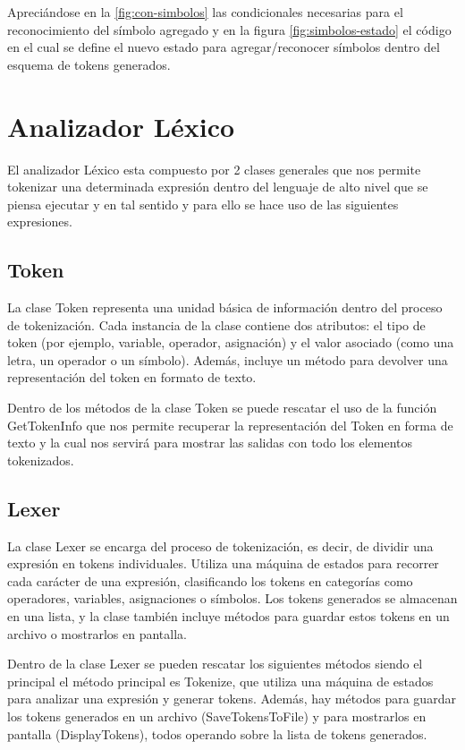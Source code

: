 \documentclass[conference]{IEEEtran}
\begin{document}
	Apreciándose en la \ref{fig:con-simbolos} las condicionales necesarias para el reconocimiento del símbolo agregado y en la figura \ref{fig:simbolos-estado} el código en el cual se define el nuevo estado para agregar/reconocer símbolos dentro del esquema de tokens generados.
	
	\section{Analizador Léxico}
	El analizador Léxico esta compuesto por 2 clases generales que nos permite tokenizar una determinada expresión dentro del lenguaje de alto nivel que se piensa ejecutar y en tal sentido y para ello se hace uso de las siguientes expresiones.
	
	\subsection{Token}
	La clase Token representa una unidad básica de información dentro del proceso de tokenización. Cada instancia de la clase contiene dos atributos: el tipo de token (por ejemplo, variable, operador, asignación) y el valor asociado (como una letra, un operador o un símbolo). Además, incluye un método para devolver una representación del token en formato de texto.
	
	Dentro de los métodos de la clase Token se puede rescatar el uso de la función GetTokenInfo que nos permite recuperar la representación del Token en forma de texto y la cual nos servirá para mostrar las salidas con todo los elementos tokenizados.
	
	\subsection{Lexer}
	La clase Lexer se encarga del proceso de tokenización, es decir, de dividir una expresión en tokens individuales. Utiliza una máquina de estados para recorrer cada carácter de una expresión, clasificando los tokens en categorías como operadores, variables, asignaciones o símbolos. Los tokens generados se almacenan en una lista, y la clase también incluye métodos para guardar estos tokens en un archivo o mostrarlos en pantalla.
	
	Dentro de la clase Lexer se pueden rescatar los siguientes métodos siendo el principal el método principal es Tokenize, que utiliza una máquina de estados para analizar una expresión y generar tokens. Además, hay métodos para guardar los tokens generados en un archivo (SaveTokensToFile) y para mostrarlos en pantalla (DisplayTokens), todos operando sobre la lista de tokens generados.
	
	
	
\end{document}
